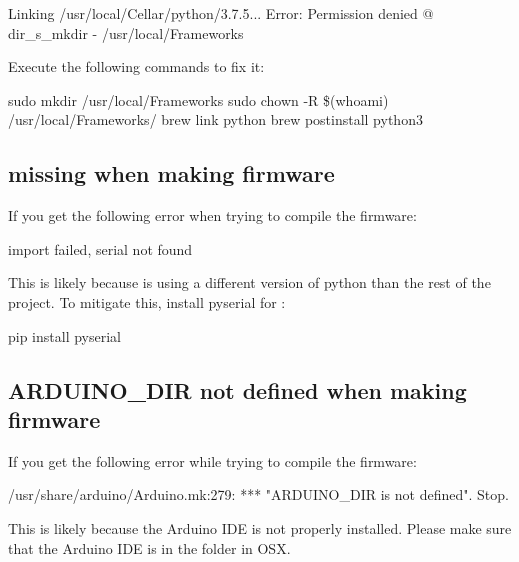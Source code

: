 \begin{snippet}
Linking /usr/local/Cellar/python/3.7.5... Error: Permission denied @ dir_s_mkdir
- /usr/local/Frameworks
\end{snippet}

\noindent Execute the following commands to fix it:

\begin{snippet}
sudo mkdir /usr/local/Frameworks
sudo chown -R \$(whoami) /usr/local/Frameworks/
brew link python
brew postinstall python3
\end{snippet}

\subsection{ missing when making firmware}


\noindent If you get the following error when trying to compile the firmware:

\begin{snippet}
  import failed, serial not found
\end{snippet}

\noindent This is likely because  is using a different version of python than the rest of the project. To mitigate this, install pyserial for :

\begin{snippet}
pip install pyserial
\end{snippet}


\subsection{ARDUINO\_DIR not defined when making firmware}

\noindent If you get the following error while trying to compile the firmware:

\begin{snippet}
/usr/share/arduino/Arduino.mk:279: *** "ARDUINO_DIR is not defined". Stop.
\end{snippet}

\noindent This is likely because the Arduino IDE is not properly installed. Please make
sure that the Arduino IDE is in the  folder in OSX. 
